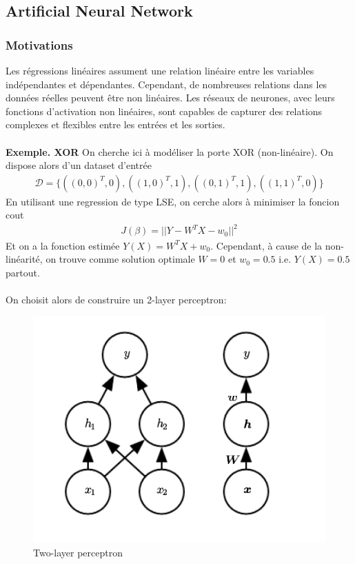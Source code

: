 \documentclass[a4paper]{article}
\begin{document}
\subsection{Artificial Neural Network}
\subsubsection{Motivations}
Les régressions linéaires assument une relation linéaire entre les variables indépendantes et dépendantes. Cependant, de nombreuses relations dans les données réelles peuvent être non linéaires. Les réseaux de neurones, avec leurs fonctions d'activation non linéaires, sont capables de capturer des relations complexes et flexibles entre les entrées et les sorties.
\\
\vspace{0.5mm}
\\
\textbf{Exemple. XOR} On cherche ici à modéliser la porte XOR (non-linéaire). On dispose alors d'un dataset d'entrée
\begin{align*}
    \mathcal{D} = \bigg\{ ((0,0)^T, 0), ((1,0)^T, 1), ((0,1)^T, 1), ((1,1)^T, 0) \bigg\}
\end{align*}
En utilisant une regression de type LSE, on cerche alors à minimiser la foncion cout
\begin{align*}
    J(\beta) = ||Y-W^T X - w_0||^2
\end{align*}
Et on a la fonction estimée $Y(X)= W^T X + w_0$. Cependant, à cause de la non-linéarité, on trouve comme solution optimale $W=0$ et $w_0=0.5$ i.e. $Y(X)=0.5$ partout.
\\
\vspace{1mm}
\\
On choisit alors de construire un 2-layer perceptron:
\begin{figure}[H]
    \centering
    \includegraphics[scale=0.7]{2-layer.png}
    \caption{Two-layer perceptron}
    \label{fig:enter-label}
\end{figure}
\end{document}
